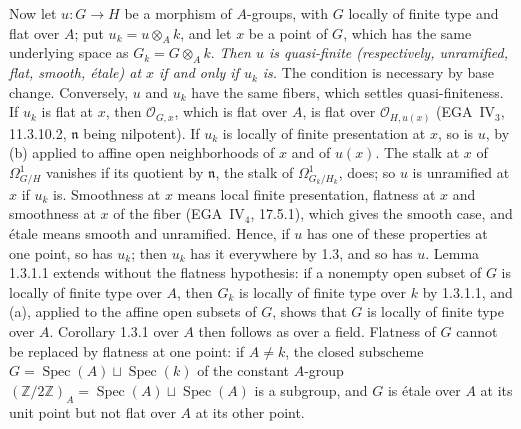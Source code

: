 Now let \(u:G\to H\) be a morphism of \(A\)-groups, with \(G\) locally of finite type and flat over
\(A\); put \(u_k=u\otimes_Ak\), and let \(x\) be a point of \(G\), which has the same underlying space
as \(G_k=G\otimes_Ak\). \emph{Then \(u\) is quasi-finite (respectively, unramified, flat, smooth,
\'etale) at \(x\) if and only if \(u_k\) is.} The condition is necessary by base change. Conversely,
\(u\) and \(u_k\) have the same fibers, which settles quasi-finiteness. If \(u_k\) is flat at \(x\),
then \(\mathcal O_{G,x}\), which is flat over \(A\), is flat over \(\mathcal O_{H,u(x)}\)
(EGA~IV\(_3\), 11.3.10.2, \(\mathfrak n\) being nilpotent). If \(u_k\) is locally of finite
presentation at \(x\), so is \(u\), by (b) applied to affine open neighborhoods of \(x\) and of
\(u(x)\). The stalk at \(x\) of \(\Omega^1_{G/H}\) vanishes if its quotient by \(\mathfrak n\), the
stalk of \(\Omega^1_{G_k/H_k}\), does; so \(u\) is unramified at \(x\) if \(u_k\) is. Smoothness at
\(x\) means local finite presentation, flatness at \(x\) and smoothness at \(x\) of the fiber
(EGA~IV\(_4\), 17.5.1), which gives the smooth case, and \'etale means smooth and unramified. Hence,
if \(u\) has one of these properties at one point, so has \(u_k\); then \(u_k\) has it everywhere by
1.3, and so has \(u\). Lemma 1.3.1.1 extends without the flatness hypothesis: if a nonempty open
subset of \(G\) is locally of finite type over \(A\), then \(G_k\) is locally of finite type over
\(k\) by 1.3.1.1, and (a), applied to the affine open subsets of \(G\), shows that \(G\) is locally
of finite type over \(A\). Corollary 1.3.1 over \(A\) then follows as over a field. Flatness of
\(G\) cannot be replaced by flatness at one point: if \(A\ne k\), the closed subscheme
\(G=\operatorname{Spec}(A)\sqcup\operatorname{Spec}(k)\) of the constant \(A\)-group
\((\mathbb Z/2\mathbb Z)_A=\operatorname{Spec}(A)\sqcup\operatorname{Spec}(A)\) is a subgroup, and
\(G\) is \'etale over \(A\) at its unit point but not flat over \(A\) at its other point.

